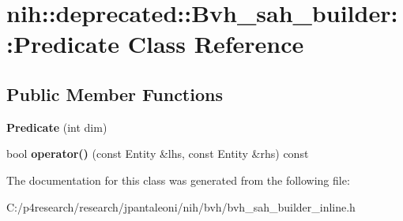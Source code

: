 \hypertarget{classnih_1_1deprecated_1_1_bvh__sah__builder_1_1_predicate}{
\section{nih\-:\-:deprecated\-:\-:\-Bvh\-\_\-sah\-\_\-builder\-:\-:\-Predicate \-Class \-Reference}
\label{classnih_1_1deprecated_1_1_bvh__sah__builder_1_1_predicate}
}
\subsection*{\-Public \-Member \-Functions}
\begin{DoxyCompactItemize}
\item 
\hypertarget{classnih_1_1deprecated_1_1_bvh__sah__builder_1_1_predicate_a13d223f7a771a571bf5b97b341c250c9}{
{\bfseries \-Predicate} (int dim)}
\label{classnih_1_1deprecated_1_1_bvh__sah__builder_1_1_predicate_a13d223f7a771a571bf5b97b341c250c9}

\item 
\hypertarget{classnih_1_1deprecated_1_1_bvh__sah__builder_1_1_predicate_aade67c097ee4dbf3c83890e0cab9d067}{
bool {\bfseries operator()} (const \-Entity \&lhs, const \-Entity \&rhs) const }
\label{classnih_1_1deprecated_1_1_bvh__sah__builder_1_1_predicate_aade67c097ee4dbf3c83890e0cab9d067}

\end{DoxyCompactItemize}


\-The documentation for this class was generated from the following file\-:\begin{DoxyCompactItemize}
\item 
\-C\-:/p4research/research/jpantaleoni/nih/bvh/bvh\-\_\-sah\-\_\-builder\-\_\-inline.\-h\end{DoxyCompactItemize}
